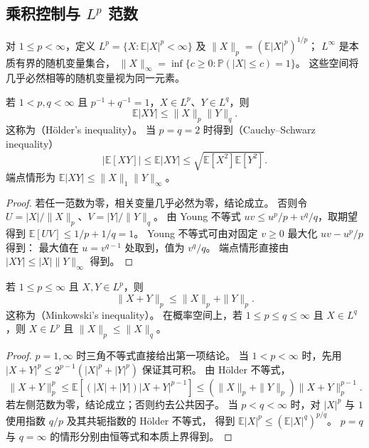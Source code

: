 \documentclass[UTF8]{ctexart}
\begin{document}
\subsection{乘积控制与 \texorpdfstring{$L^p$}{Lp} 范数}

对 $1\leq p<\infty$，定义
$L^p=\{X:\mathbb E|X|^p<\infty\}$ 及
$\|X\|_p=(\mathbb E|X|^p)^{1/p}$；
$L^\infty$ 是本质有界的随机变量集合，
$\|X\|_\infty=\inf\{c\geq0:\mathbb P(|X|\leq c)=1\}$。
这些空间将几乎必然相等的随机变量视为同一元素。

\begin{theorem}
\label{thm:expectation-holder}
若 $1<p,q<\infty$ 且 $p^{-1}+q^{-1}=1$，$X\in L^p$、$Y\in L^q$，则
\begin{equation}
  \mathbb E|XY|\leq\|X\|_p\|Y\|_q.
  \label{eq:expectation-holder}
\end{equation}
这称为（Hölder's inequality）。
当 $p=q=2$ 时得到（Cauchy--Schwarz inequality）
\[
  |\mathbb E[XY]|
  \leq\mathbb E|XY|
  \leq\sqrt{\mathbb E[X^2]\mathbb E[Y^2]}.
\]
端点情形为 $\mathbb E|XY|\leq\|X\|_1\|Y\|_\infty$。
\end{theorem}

\begin{proof}
若任一范数为零，相关变量几乎必然为零，结论成立。
否则令 $U=|X|/\|X\|_p$、$V=|Y|/\|Y\|_q$。
由 Young 不等式 $uv\leq u^p/p+v^q/q$，取期望得到
$\mathbb E[UV]\leq1/p+1/q=1$。
Young 不等式可由对固定 $v\geq0$ 最大化 $uv-u^p/p$ 得到：
最大值在 $u=v^{q-1}$ 处取到，值为 $v^q/q$。
端点情形直接由 $|XY|\leq|X|\|Y\|_\infty$ 得到。
\end{proof}

\begin{proposition}
\label{prop:expectation-lp}
若 $1\leq p\leq\infty$ 且 $X,Y\in L^p$，则
\[
  \|X+Y\|_p\leq\|X\|_p+\|Y\|_p.
\]
这称为（Minkowski's inequality）。
在概率空间上，若 $1\leq p\leq q\leq\infty$ 且 $X\in L^q$，则
$X\in L^p$ 且 $\|X\|_p\leq\|X\|_q$。
\end{proposition}

\begin{proof}
$p=1,\infty$ 时三角不等式直接给出第一项结论。
当 $1<p<\infty$ 时，先用
$|X+Y|^p\leq2^{p-1}(|X|^p+|Y|^p)$ 保证其可积。
由 Hölder 不等式，
\[
  \|X+Y\|_p^p
  \leq\mathbb E[(|X|+|Y|)|X+Y|^{p-1}]
  \leq(\|X\|_p+\|Y\|_p)\|X+Y\|_p^{p-1}.
\]
若左侧范数为零，结论成立；否则约去公共因子。
当 $p<q<\infty$ 时，对 $|X|^p$ 与 $1$ 使用指数 $q/p$ 及其共轭指数的 Hölder 不等式，
得到 $\mathbb E|X|^p\leq(\mathbb E|X|^q)^{p/q}$。
$p=q$ 与 $q=\infty$ 的情形分别由恒等式和本质上界得到。
\end{proof}
\end{document}
